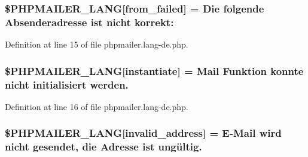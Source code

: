 \subsubsection[{\texorpdfstring{\$\+P\+H\+P\+M\+A\+I\+L\+E\+R\+\_\+\+L\+A\+NG}{$PHPMAILER_LANG}}]{\setlength{\rightskip}{0pt plus 5cm}\$P\+H\+P\+M\+A\+I\+L\+E\+R\+\_\+\+L\+A\+NG\mbox{[}\textquotesingle{}from\+\_\+failed\textquotesingle{}\mbox{]} = \textquotesingle{}Die folgende Absenderadresse ist nicht korrekt\+: \textquotesingle{}}\hypertarget{phpmailer_8lang-de_8php_adf832ae12155a09be077c6d5e4fd7e22}{}\label{phpmailer_8lang-de_8php_adf832ae12155a09be077c6d5e4fd7e22}


Definition at line 15 of file phpmailer.\+lang-\/de.\+php.

\subsubsection[{\texorpdfstring{\$\+P\+H\+P\+M\+A\+I\+L\+E\+R\+\_\+\+L\+A\+NG}{$PHPMAILER_LANG}}]{\setlength{\rightskip}{0pt plus 5cm}\$P\+H\+P\+M\+A\+I\+L\+E\+R\+\_\+\+L\+A\+NG\mbox{[}\textquotesingle{}instantiate\textquotesingle{}\mbox{]} = \textquotesingle{}Mail Funktion konnte nicht initialisiert werden.\textquotesingle{}}\hypertarget{phpmailer_8lang-de_8php_ad58dde16780f4770ccf4dd282ea1f5ad}{}\label{phpmailer_8lang-de_8php_ad58dde16780f4770ccf4dd282ea1f5ad}


Definition at line 16 of file phpmailer.\+lang-\/de.\+php.

\subsubsection[{\texorpdfstring{\$\+P\+H\+P\+M\+A\+I\+L\+E\+R\+\_\+\+L\+A\+NG}{$PHPMAILER_LANG}}]{\setlength{\rightskip}{0pt plus 5cm}\$P\+H\+P\+M\+A\+I\+L\+E\+R\+\_\+\+L\+A\+NG\mbox{[}\textquotesingle{}invalid\+\_\+address\textquotesingle{}\mbox{]} = \textquotesingle{}E-\/Mail wird nicht gesendet, die Adresse ist ungültig.\textquotesingle{}}\hypertarget{phpmailer_8lang-de_8php_a42d61bcea4c79599ecb44fd062f54d47}{}\label{phpmailer_8lang-de_8php_a42d61bcea4c79599ecb44fd062f54d47}


